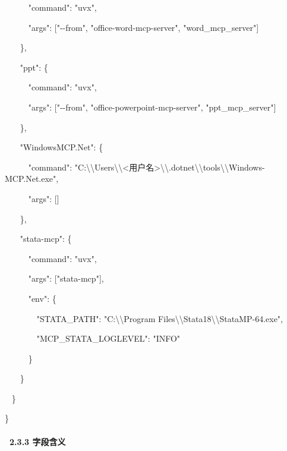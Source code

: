 \documentclass[
  american,
  chinese,
]{ctexart}
\begin{document}
\foreignlanguage{american}{{~~~~~
}"command": "{uvx}",}

\foreignlanguage{american}{{~~~~~
}"{args}": {[}"-\/-from",
"office-word-{mcp}-server", "{word\_mcp\_server}"{]}}

\foreignlanguage{american}{{~~~ }\},}

\foreignlanguage{american}{{~~~ }"ppt{": \{}}

\foreignlanguage{american}{{~~~~~
}"command": "{uvx}",}

\foreignlanguage{american}{{~~~~~
}"{args}": {[}"-\/-from",
"office-{powerpoint}-{mcp}-server",
"{ppt\_mcp\_server}"{]}}

\foreignlanguage{american}{{~~~ }\},}

\foreignlanguage{american}{{~~~
}"WindowsMCP.Net{": \{}}

\foreignlanguage{american}{{~~~~~
}"command": "C:\textbackslash\textbackslash Users\textbackslash\textbackslash\textless{}}{用户名}\foreignlanguage{american}{\textgreater\textbackslash\textbackslash.dotnet\textbackslash\textbackslash tools\textbackslash\textbackslash Windows-MCP.Net.exe",}

\foreignlanguage{american}{{~~~~~
}"{args}": {[}{]}}

\foreignlanguage{american}{{~~~ }\},}

\foreignlanguage{american}{{~~~ }"{{stata}-mcp}{":
\{}}

\foreignlanguage{american}{{~~~~~
}"command": "{uvx}",}

\foreignlanguage{american}{{~~~~~
}"{args}": {[}"{stata-mcp}"{]},}

\foreignlanguage{american}{{~~~~~
}"env{": \{}}

\foreignlanguage{american}{{~~~~~~~
}"STATA\_PATH": "C:\textbackslash\textbackslash Program
Files\textbackslash\textbackslash Stata18\textbackslash\textbackslash StataMP-64.exe",}

\foreignlanguage{american}{{~~~~~~~
}"MCP\_STATA\_LOGLEVEL": "INFO"}

\foreignlanguage{american}{{~~~~~ }\}}

\foreignlanguage{american}{{~~~ }\}}

\foreignlanguage{american}{{~ }\}}

\foreignlanguage{american}{\}}

\paragraph{\texorpdfstring{\foreignlanguage{american}{{~}}\foreignlanguage{american}{2.3.3 }{\foreignlanguage{american}{字段含义}}}{~2.3.3 字段含义}}\label{ux5b57ux6bb5ux542bux4e49}
\end{document}
